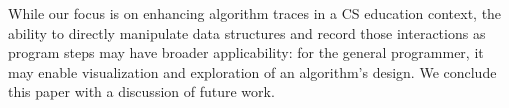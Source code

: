 While our focus is on enhancing algorithm traces in a CS education context, the
ability to directly manipulate data structures and record those interactions as
program steps may have broader applicability: for the general programmer, it may
enable visualization and exploration of an algorithm's design. We conclude this
paper with a discussion of future work.

